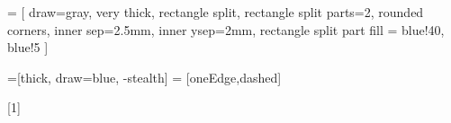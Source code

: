 \newcommand{\red}[1]{{\color{red}#1}}

 = [
draw=gray, very thick,
rectangle split, rectangle split parts=2, rounded corners, inner sep=2.5mm, inner ysep=2mm,
rectangle split part fill = {blue!40, blue!5}
]

\newenvironment{scprooftree}
{\leavevmode\hbox\bgroup}
{\DisplayProof\egroup}

 =[thick, draw=blue, -{stealth}]
 = [oneEdge,dashed]

\newcommand{\charset}[2]{\llbracket #1 \rrbracket_{#2}}

[1]{%
\begin{center}
\end{center}
}

\newcommand{\True}{\text{True}}
\newcommand{\False}{\text{False}}